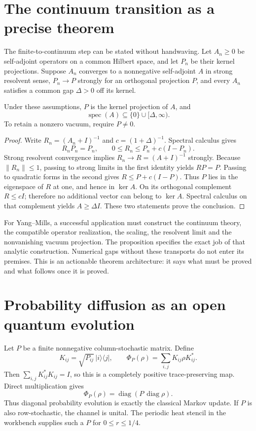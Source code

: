 \section{The continuum transition as a precise theorem}

The finite-to-continuum step can be stated without handwaving. Let $A_n\ge0$ be self-adjoint operators on a common Hilbert space, and let $P_n$ be their kernel projections. Suppose $A_n$ converges to a nonnegative self-adjoint $A$ in strong resolvent sense, $P_n\to P$ strongly for an orthogonal projection $P$, and every $A_n$ satisfies a common gap $\Delta>0$ off its kernel.

\begin{proposition}
Under these assumptions, $P$ is the kernel projection of $A$, and
\[
 \operatorname{spec}(A)\subseteq\{0\}\cup[\Delta,\infty).
\]
To retain a nonzero vacuum, require $P\ne0$.
\end{proposition}
\begin{proof}
Write $R_n=(A_n+I)^{-1}$ and $c=(1+\Delta)^{-1}$. Spectral calculus gives
\[
 R_nP_n=P_n,\qquad 0\le R_n\le P_n+c(I-P_n).
\]
Strong resolvent convergence implies $R_n\to R=(A+I)^{-1}$ strongly. Because $\|R_n\|\le1$, passing to strong limits in the first identity yields $RP=P$. Passing to quadratic forms in the second gives $R\le P+c(I-P)$. Thus $P$ lies in the eigenspace of $R$ at one, and hence in $\ker A$. On its orthogonal complement $R\le cI$; therefore no additional vector can belong to $\ker A$. Spectral calculus on that complement yields $A\ge\Delta I$. These two statements prove the conclusion.
\end{proof}

For Yang--Mills, a successful application must construct the continuum theory, the compatible operator realization, the scaling, the resolvent limit and the nonvanishing vacuum projection. The proposition specifies the exact job of that analytic construction. Numerical gaps without these transports do not enter its premises. This is an actionable theorem architecture: it says what must be proved and what follows once it is proved.

\section{Probability diffusion as an open quantum evolution}

Let $P$ be a finite nonnegative column-stochastic matrix. Define
\[
 K_{ij}=\sqrt{P_{ij}}\,|i\rangle\langle j|,\qquad
 \Phi_P(\rho)=\sum_{i,j}K_{ij}\rho K_{ij}^*.
\]
Then $\sum_{i,j}K_{ij}^*K_{ij}=I$, so this is a completely positive trace-preserving map. Direct multiplication gives
\[
 \Phi_P(\rho)=\operatorname{diag}(P\,\operatorname{diag}\rho).
\]
Thus diagonal probability evolution is exactly the classical Markov update. If $P$ is also row-stochastic, the channel is unital. The periodic heat stencil in the workbench supplies such a $P$ for $0\le r\le1/4$.

